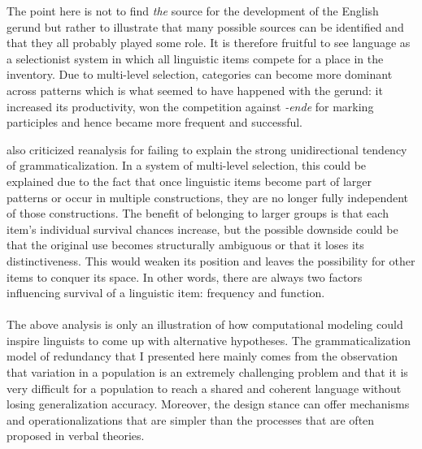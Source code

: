 The point here is not to find {\em the} source for the development of the English gerund but rather to illustrate that many possible sources can be identified and that they all probably played some role. It is therefore fruitful to see language as a selectionist system in which all linguistic items compete for a place in the inventory. Due to multi-level selection, categories can become more dominant across patterns which is what seemed to have happened with the gerund: it increased its productivity, won the competition against {\em -ende} for marking participles and hence became more frequent and successful.

\citet{haspelmath98does} also criticized reanalysis for failing to explain the strong unidirectional tendency of grammaticalization. In a system of multi-level selection, this could be explained due to the fact that once linguistic items become part of larger patterns or occur in multiple constructions, they are no longer fully independent of those constructions. The benefit of belonging to larger groups is that each item's individual survival chances increase, but the possible downside could be that the original use becomes structurally ambiguous or that it loses its distinctiveness. This would weaken its position and leaves the possibility for other items to conquer its space. In other words, there are always two factors influencing survival of a linguistic item: frequency and function.
\\
\\
 The above analysis is only an illustration of how computational modeling could inspire linguists to come up with alternative hypotheses. The grammaticalization model of  redundancy that I presented here mainly comes from the observation that variation in a population is an extremely challenging problem and that it is very difficult for a population to reach a shared and coherent language without losing generalization accuracy. Moreover, the design stance can offer mechanisms and operationalizations that are simpler than the processes that are often proposed in verbal theories.

